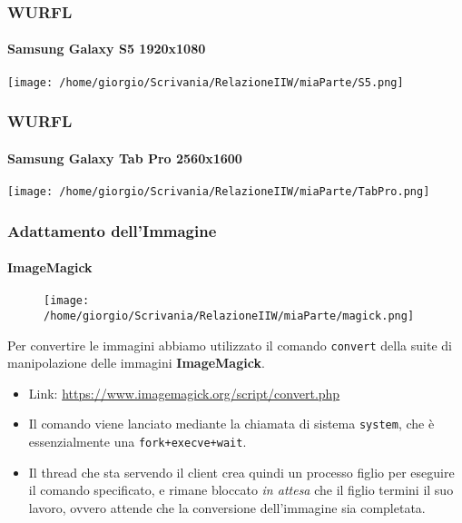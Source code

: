 \documentclass{beamer}
\begin{document}
\begin{frame}
\frametitle{WURFL}
\framesubtitle{Samsung Galaxy S5 1920x1080}


\texttt{[image: /home/giorgio/Scrivania/RelazioneIIW/miaParte/S5.png]}



\end{frame}


\begin{frame}
\frametitle{WURFL}
\framesubtitle{Samsung Galaxy Tab Pro 2560x1600}


\texttt{[image: /home/giorgio/Scrivania/RelazioneIIW/miaParte/TabPro.png]}



\end{frame}



\begin{frame}
\frametitle{Adattamento dell'Immagine}
\framesubtitle{ImageMagick}
\begin{figure}
    \texttt{[image: /home/giorgio/Scrivania/RelazioneIIW/miaParte/magick.png]}
\end{figure}

Per convertire le immagini abbiamo utilizzato il comando \texttt{convert} della suite di manipolazione delle immagini \textbf{ImageMagick}.
\begin{itemize}
\item Link: \href{https://www.imagemagick.org/script/convert.php}{\color{blue}  https://www.imagemagick.org/script/convert.php} 
\item Il comando viene lanciato mediante la chiamata di sistema \texttt{system}, che è essenzialmente una \texttt{fork+execve+wait}.
\item Il thread che sta servendo il client crea quindi un processo figlio per eseguire il comando specificato, e rimane bloccato \textit{in attesa} che il figlio termini il suo lavoro, ovvero attende che la conversione dell'immagine sia completata.
\end{itemize}
\end{frame}
\end{document}
